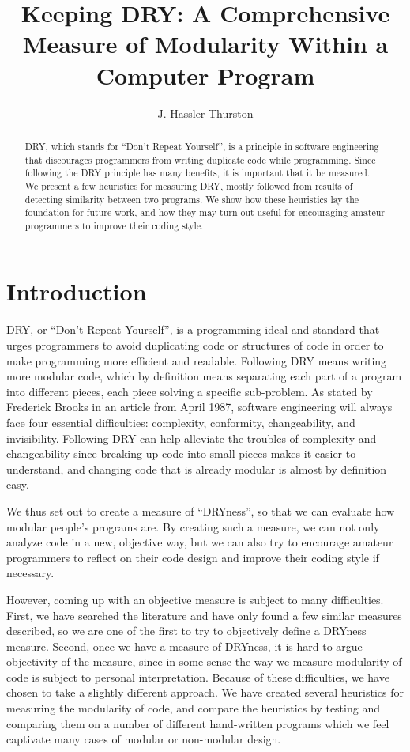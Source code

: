 \documentclass{article}
\title{Keeping DRY: A Comprehensive Measure of Modularity Within a Computer Program}
\author{J. Hassler Thurston}
\date{}
\begin{document}
\maketitle

\begin{abstract}

DRY, which stands for ``Don't Repeat Yourself'', is a principle in software engineering that discourages programmers from
writing duplicate code while programming. Since following the DRY principle has many benefits, it is important that it 
be measured. We present a few heuristics for measuring DRY, mostly followed from results of detecting
similarity between two programs. We show how these heuristics lay the foundation for future work, and how they
 may turn out useful for encouraging amateur programmers to improve their coding style.

\end{abstract}

\section{Introduction} DRY, or ``Don't Repeat Yourself'', is a programming ideal and standard that urges programmers to avoid duplicating code or structures of code in order to make programming more efficient and readable. Following DRY means writing more modular
code, which by definition means separating each part of a program into different pieces, each piece solving a specific sub-problem. As stated by Frederick Brooks in an article
from April 1987\cite{NoSilverBullet}, software engineering will always face four essential difficulties: complexity, conformity, 
changeability, and invisibility. Following DRY can help alleviate the troubles of complexity and changeability since breaking up code
into small pieces makes it easier to understand, and changing code that is already modular is almost by definition easy.

We thus set out to create a measure of ``DRYness'', so that we can evaluate how modular people's programs are.
By creating such a measure, we can not only analyze code in a new, objective way, but we can also try to encourage amateur programmers
to reflect on their code design and improve their coding style if necessary.

However, coming up with an objective measure is subject to many difficulties. First, we have searched the literature and have only found a few similar measures described, so we are one of the first to try to objectively define a DRYness measure.
Second, once we have a measure of DRYness,
it is hard to argue objectivity of the measure, since in some sense the way we measure modularity of code is subject to personal
interpretation. Because of these difficulties, we have chosen to take a slightly different approach. We have created several 
heuristics for measuring the modularity of code, and compare the heuristics by testing and comparing them on a number of different
hand-written programs which we feel captivate many cases of modular or non-modular design.
\end{document}

